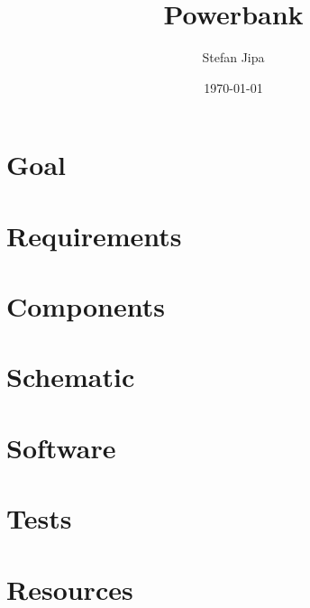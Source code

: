 \documentclass[11pt,a4paper]{article}
\title{Powerbank}
\author{Stefan Jipa}
\date{\today}
\begin{document}
\maketitle
\tableofcontents
\newpage

\section{Goal}

\section{Requirements}

\section{Components}

\section{Schematic}

\section{Software}

\section{Tests}

\section{Resources}
\end{document}
